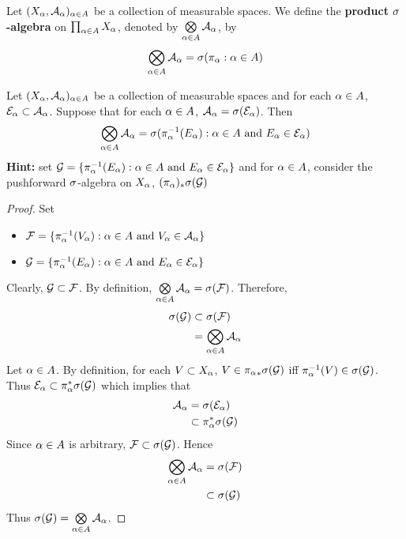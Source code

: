\documentclass{book}
\begin{document}
	\begin{defn} 
		Let $(X_{\alpha}, \mathcal{A}_{\alpha})_{\alpha \in A}$ be a collection of measurable spaces. We define the \textbf{product $\sigma$-algebra} on $\prod_{\alpha \in A}X_{\alpha}$, denoted by $\bigotimes\limits_{\alpha \in A} \mathcal{A}_{\alpha}$, by $$\bigotimes\limits_{\alpha \in A} \mathcal{A}_{\alpha} = \sigma(\pi_{\alpha}: \alpha \in A)$$
	\end{defn}

	\begin{ex} 
		Let $(X_{\alpha}, \mathcal{A}_{\alpha})_{\alpha \in A}$ be a collection of measurable spaces and for each $\alpha \in A$, $\mathcal{E}_{\alpha} \subset \mathcal{A}_{\alpha}$. Suppose that for each $\alpha \in A$, $\mathcal{A}_{\alpha} = \sigma(\mathcal{E}_{\alpha})$. Then 
		$$\bigotimes\limits_{\alpha \in A} \mathcal{A}_{\alpha} = \sigma( \pi_{\alpha}^{-1}(E_{\alpha}): \alpha \in A \text{ and } E_{\alpha} \in \mathcal{E}_{\alpha})$$ 
		\textbf{Hint:} set $\mathcal{G} = \{\pi_{\alpha}^{-1}(E_{\alpha}): \alpha \in A \text{ and } E_{\alpha} \in \mathcal{E}_{\alpha}\}$ and for $\alpha \in A$, consider the pushforward $\sigma$-algebra on $X_{\alpha}$, $(\pi_{\alpha})_* \sigma( \mathcal{G})$
	\end{ex}

 	\begin{proof}
 		Set 
 		\begin{itemize}
 			\item $\mathcal{F} = \{\pi_{\alpha}^{-1}(V_{\alpha}): \alpha \in A \text{ and } V_{\alpha} \in \mathcal{A}_{\alpha}\}$ 
 			\item $\mathcal{G} = \{\pi_{\alpha}^{-1}(E_{\alpha}): \alpha \in A \text{ and } E_{\alpha} \in \mathcal{E}_{\alpha}\}$
 		\end{itemize}
 		Clearly, $\mathcal{G} \subset \mathcal{F}$. By definition, $\bigotimes\limits_{\alpha \in A} \mathcal{A}_{\alpha} = \sigma(\mathcal{F})$. Therefore, 
 		\begin{align*}
 			\sigma(\mathcal{G}) 
 			& \subset \sigma(\mathcal{F}) \\
 			& = \bigotimes\limits_{\alpha \in A} \mathcal{A}_{\alpha}
 		\end{align*}
 		Let $\alpha \in A$. By definition, for each $V \subset X_{\alpha}$, $V \in {\pi_{\alpha}}_* \sigma(\mathcal{G})$ iff $\pi_{\alpha}^{-1}(V) \in \sigma(\mathcal{G})$. Thus $\mathcal{E}_{\alpha} \subset \pi_{\alpha}^* \sigma(\mathcal{G})$ which implies that 
 		\begin{align*}
 			\mathcal{A}_{\alpha} 
 			& = \sigma(\mathcal{E}_{\alpha}) \\
 			& \subset \pi_{\alpha}^* \sigma(\mathcal{G})
 		\end{align*}
 		Since $\alpha \in A$ is arbitrary, $\mathcal{F} \subset \sigma(\mathcal{G})$. Hence 
 		\begin{align*}
 			\bigotimes\limits_{\alpha \in A} \mathcal{A}_{\alpha} 
 			& = \sigma(\mathcal{F}) \\
 			& \subset \sigma(\mathcal{G})
 		\end{align*}
 		Thus $\sigma(\mathcal{G}) = \bigotimes\limits_{\alpha \in A} \mathcal{A}_{\alpha}$.
 	\end{proof}
 
\end{document}
